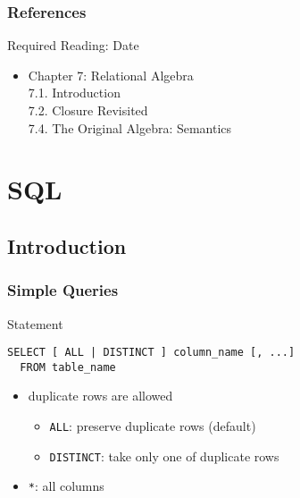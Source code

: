 \documentclass[dvipsnames]{beamer}
\theoremstyle{plain}
\begin{document}
\begin{frame}
  \frametitle{References}

  \begin{block}{Required Reading: Date}
    \begin{itemize}
      \item Chapter 7: Relational Algebra\\
        7.1. \alert{Introduction}\\
        7.2. \alert{Closure Revisited}\\
        7.4. \alert{The Original Algebra: Semantics}
    \end{itemize}
  \end{block}
\end{frame}

\lstset{language=FullSQL}

\section{SQL}

\subsection{Introduction}

\begin{frame}[fragile]
  \frametitle{Simple Queries}

  \begin{block}{Statement}
    \begin{lstlisting}
SELECT [ ALL | DISTINCT ] column_name [, ...]
  FROM table_name
    \end{lstlisting}
  \end{block}

  \pause
  \begin{itemize}
    \item duplicate rows are allowed
    \begin{itemize}
        \item \lstinline!ALL!: preserve duplicate rows (default)
        \item \lstinline!DISTINCT!: take only one of duplicate rows
    \end{itemize}

    \item \lstinline!*!: all columns
  \end{itemize}
\end{frame}
\end{document}
